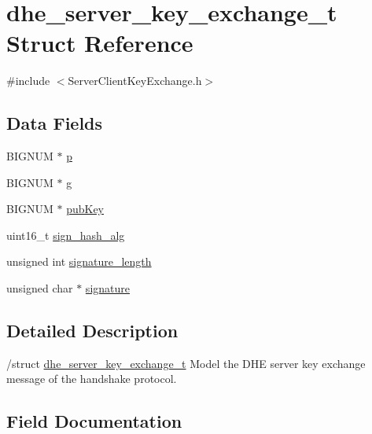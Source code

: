 \hypertarget{structdhe__server__key__exchange__t}{}\section{dhe\+\_\+server\+\_\+key\+\_\+exchange\+\_\+t Struct Reference}
\label{structdhe__server__key__exchange__t}


{\ttfamily \#include $<$Server\+Client\+Key\+Exchange.\+h$>$}

\subsection*{Data Fields}
\begin{DoxyCompactItemize}
\item 
B\+I\+G\+N\+UM $\ast$ \hyperlink{structdhe__server__key__exchange__t_a4ed2e531b9fd8a6ca6ad6804565299a7}{p}
\item 
B\+I\+G\+N\+UM $\ast$ \hyperlink{structdhe__server__key__exchange__t_ada27d9fb07daaac14be19b4ce12a7400}{g}
\item 
B\+I\+G\+N\+UM $\ast$ \hyperlink{structdhe__server__key__exchange__t_a1aca399a862132922f9cabef045d11e3}{pub\+Key}
\item 
uint16\+\_\+t \hyperlink{structdhe__server__key__exchange__t_a07ea01aadbb81f38a9a27e324d11f54e}{sign\+\_\+hash\+\_\+alg}
\item 
unsigned int \hyperlink{structdhe__server__key__exchange__t_a23a683d5129246d9adbd0029612d06a8}{signature\+\_\+length}
\item 
unsigned char $\ast$ \hyperlink{structdhe__server__key__exchange__t_a775505f2a74638cda44fdd79c4e07993}{signature}
\end{DoxyCompactItemize}


\subsection{Detailed Description}
/struct \hyperlink{structdhe__server__key__exchange__t}{dhe\+\_\+server\+\_\+key\+\_\+exchange\+\_\+t} Model the D\+HE server key exchange message of the handshake protocol. 

\subsection{Field Documentation}
